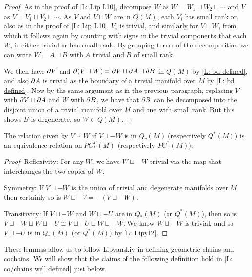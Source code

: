 \begin{proof}
As in the proof of \cref{L: Lip L10}, decompose $W$ as $W=W_1\sqcup W_2\sqcup \cdots$ and $V$ as $V=V_1\sqcup V_2\sqcup \cdots$. As $V$ and $V\sqcup W$ are in $Q(M)$, each $V_i$ has small rank or, also as in the proof of \cref{L: Lip L10}, $V_i$ is trivial, and similarly for $V\sqcup W$, from which it follows again by counting with signs in the trivial components that each $W_i$ is either trivial or has small rank.
By grouping terms of the decomposition we can write $W=A\sqcup B$ with $A$ trivial and $B$ of small rank.

We then have $\partial V$ and $\partial (V\sqcup W)=\partial V\sqcup \partial A\sqcup \partial B$ in $Q(M)$  by \cref{L: bd defined}, and also $\partial A$ is trivial as the boundary of a trivial manifold over $M$ by \cref{L: bd defined}. Now by the same argument as in the previous paragraph, replacing $V$ with $\partial V \sqcup \partial A$ and $W$ with $\partial B$, we have that $\partial B$ can be decomposed into the disjoint union of a trivial manifold over $M$ and one with small rank. But this shows $B$ is degenerate, so $W\in Q(M)$.
\end{proof}

\begin{lemma}\label{L: cancel Q}
The relation given by $V\sim W$ if $V\sqcup -W$ is in $Q_*(M)$ (respectively $Q^*(M)$) is an equivalence relation on $PC^\Gamma_*(M)$ (respectively $PC_\Gamma^*(M)$).
\end{lemma}
\begin{proof}
Reflexivity: For any $W$, we have $W\sqcup -W$  trivial via the map that interchanges the two copies of $W$.

Symmetry: If $V\sqcup -W$ is the union of trivial and degenerate manifolds over $M$ then certainly so is $W\sqcup -V=-(V\sqcup -W)$.

Transitivity: If $V\sqcup -W$ and $W\sqcup -U$ are in $Q_*(M)$ (or $Q^*(M)$), then so is $V\sqcup -W\sqcup W\sqcup -U\cong V\sqcup -U\sqcup W\sqcup -W$. We know $W\sqcup -W$ is trivial, and so $V\sqcup -U$ is in $Q_*(M)$ (or $Q^*(M)$) by \cref{L: Lipy12}.
\end{proof}





These lemmas allow us to follow Lipyanskiy in defining geometric chains and cochains. We will show that the claims of the following definition hold in \cref{L: co/chains well defined} just below.


